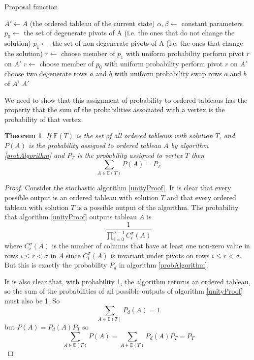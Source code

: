 \documentclass{article}
\newtheorem{theorem}{Theorem}
\begin{document}
\begin{algorithm}
\caption{Proposal function}
\label{proposal}
\begin{algorithmic}
\State $A' \leftarrow A$ (the ordered tableau of the current state)
\State $\alpha, \beta \leftarrow$ constant parameters
\State $p_0 \leftarrow$ the set of degenerate pivots of A (i.e. the ones that do not change the solution)
\State $p_1 \leftarrow$ the set of non-degenerate pivots of A (i.e. the ones that change the solution)
  \State $r \leftarrow$ choose member of $p_1$ with uniform probability
  \State perform pivot $r$ on $A'$
  \State $r \leftarrow$ choose member of $p_0$ with uniform probability
  \State perform pivot $r$ on $A'$
\Else
  \State choose two degenerate rows $a$ and $b$ with uniform probability
  \State swap rows $a$ and $b$ of $A'$ 
\EndIf
\State \Return $A'$
\EndFunction
\end{algorithmic}
\end{algorithm}

We need to show that this assignment of probability to ordered tableaus has the property that the sum of the probabilities associated with a vertex is the probability of that vertex.

\begin{theorem}
If $\mathbb{E}(T)$ is the set of all ordered tableaus with solution $T$, and $P(A)$ is the probability assigned to ordered tableau $A$ by algorithm \ref{probAlgorithm} and $P_T$ is the probability assigned to vertex $T$ then
\[
\sum_{A \in \mathbb{E}(T)} P(A) = P_T
\]
\end{theorem}
\begin{proof}
Consider the stochastic algorithm \ref{unityProof}. It is clear that every possible output is an ordered tableau with solution $T$ and that every ordered tableau with solution $T$ is a possible output of the algorithm. The probability that algorithm \ref{unityProof} outputs tableau $A$ is
\[
\frac{1}{\prod_{i=0}^{\sigma-1} C_i^\sigma(A)} 
\]
where $C_i^\sigma(A)$ is the number of columns that have at least one non-zero value in rows $i \le r < \sigma$ in $A$ since $C_i^\sigma(A)$ is invariant under pivots on rows $i \le r < \sigma$. But this is exactly the probability $P_d$ in algorithm \ref{probAlgorithm}.

It is also clear that, with probability 1, the algorithm returns an ordered tableau, so the sum of the probabilities of all possible outputs of algorithm \ref{unityProof} must also be 1. So
\[
\sum_{A \in \mathbb{E}(T)} P_d(A) = 1
\]
but $P(A) = P_d(A)P_T$ so 
\[
\sum_{A \in \mathbb{E}(T)} P(A) = \sum_{A \in \mathbb{E}(T)} P_d(A)P_T = P_T
\]
\end{proof}
\end{document}
